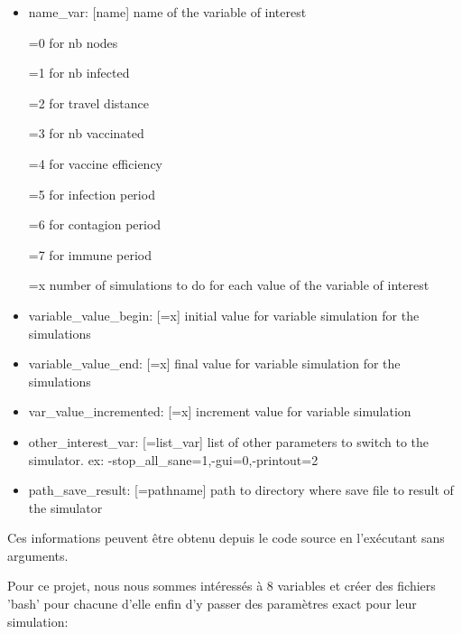 \documentclass[a4paper, 11pt]{article}
\begin{document}
			\begin{itemize}
				\item name\_var: [name] name of the variable of interest
				\item [=0] for nb nodes
				\item [=1] for nb infected
				\item [=2] for travel distance
				\item [=3] for nb vaccinated
				\item [=4] for vaccine efficiency
				\item [=5] for infection period
				\item [=6] for contagion period
				\item [=7] for immune period
				\item [=x] number of simulations to do for each value of the variable of interest
				\item variable\_value\_begin:  [=x] initial value for variable simulation for the simulations
				\item variable\_value\_end:    [=x] final value for variable simulation for the simulations
				\item var\_value\_incremented: [=x] increment value for variable simulation
				\item other\_interest\_var:    [=list\_var] list of other parameters to switch to the simulator. ex: -stop\_all\_sane=1,-gui=0,-printout=2
				\item path\_save\_result:      [=pathname] path to directory where save file to result of the simulator
			\end{itemize}

			Ces informations peuvent être obtenu depuis le code source en l'exécutant sans arguments.

			Pour ce projet, nous nous sommes intéressés à 8 variables et créer des fichiers 'bash' pour chacune d'elle enfin d'y passer des paramètres exact pour leur simulation:
			
\end{document}
